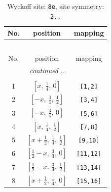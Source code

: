 \documentclass[fleqn,8pt]{jsarticle}
\begin{document}
\begin{longtable}{ccc}
\caption{Wyckoff site: {\tt 8e}, site symmetry: {\tt 2..}}
 \\
 \hline \hline
No. & position & mapping \\ \hline \endfirsthead

\multicolumn{2}{l}{\tablename\ \thetable{}} \\
 \hline \hline
No. & position & mapping \\ \hline \endhead

 \hline \hline
\multicolumn{2}{r}{\footnotesize\it continued ...} \\ \endfoot

 \hline \hline
\multicolumn{2}{r}{} \\ \endlastfoot

1 & $\left[ x,\, \frac{1}{4},\, 0 \right]$ & {\tt [1,2]} \\ \hline
2 & $\left[ - x,\, \frac{3}{4},\, \frac{1}{2} \right]$ & {\tt [3,4]} \\ \hline
3 & $\left[ - x,\, \frac{3}{4},\, 0 \right]$ & {\tt [5,6]} \\ \hline
4 & $\left[ x,\, \frac{1}{4},\, \frac{1}{2} \right]$ & {\tt [7,8]} \\ \hline
5 & $\left[ x + \frac{1}{2},\, \frac{1}{4},\, \frac{1}{2} \right]$ & {\tt [9,10]} \\ \hline
6 & $\left[ \frac{1}{2} - x,\, \frac{3}{4},\, 0 \right]$ & {\tt [11,12]} \\ \hline
7 & $\left[ \frac{1}{2} - x,\, \frac{3}{4},\, \frac{1}{2} \right]$ & {\tt [13,14]} \\ \hline
8 & $\left[ x + \frac{1}{2},\, \frac{1}{4},\, 0 \right]$ & {\tt [15,16]} \\
\end{longtable}
\renewcommand{\arraystretch}{1.2}
\end{document}
